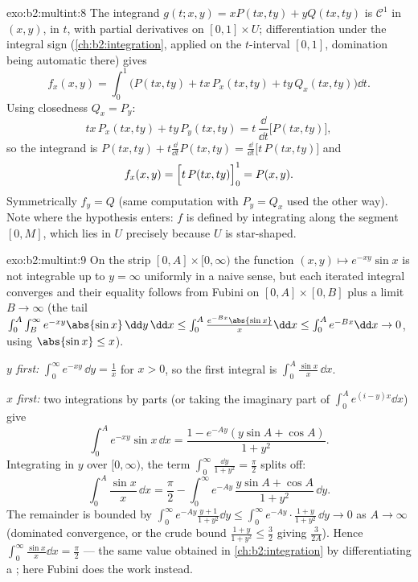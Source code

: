 \begin{solution}{exo:b2:multint:8}
The integrand $g(t; x, y) = xP(tx, ty) + yQ(tx, ty)$ is
$\mathcal{C}^1$ in $(x, y)$,  in $t$, with partial
derivatives  on $[0,1] \times U$; differentiation under
the integral sign (\cref{ch:b2:integration}, applied on the
 $t$-interval $[0,1]$, domination being automatic there)
gives
\[
f_x(x, y)
= \int_0^1 \bigl(P(tx, ty) + tx\,P_x(tx, ty)
+ ty\,Q_x(tx, ty)\bigr)\dd t .
\]
Using closedness $Q_x = P_y$:
\[
tx\,P_x(tx, ty) + ty\,P_y(tx, ty)
= t\,\frac{\dd}{\dd t}\bigl[P(tx, ty)\bigr] ,
\]
so the integrand is $P(tx, ty) + t\frac{\dd}{\dd t}P(tx, ty) =
\frac{\dd}{\dd t}\bigl[t\,P(tx, ty)\bigr]$ and
\[
f_x(x, y) = \Bigl[t\,P(tx, ty)\Bigr]_0^1 = P(x, y) .
\]
Symmetrically $f_y = Q$ (same computation with $P_y = Q_x$ used
the other way). Note where the hypothesis enters: $f$ is defined
by integrating along the segment $[0, M]$, which lies in $U$
precisely because $U$ is star-shaped.
\end{solution}

\begin{solution}{exo:b2:multint:9}
On the strip $[0, A] \times [0, \infty)$ the function $(x, y)
\mapsto e^{-xy}\sin x$ is not  integrable up to $y =
\infty$ uniformly in a naive sense, but each iterated integral
converges and their equality follows from Fubini on $[0, A]
\times [0, B]$ plus a limit $B \to \infty$ (the tail
$\int_0^A\int_B^\infty e^{-xy}\abs{\sin x}\,\dd y\,\dd x \leq
\int_0^A \frac{e^{-Bx}\abs{\sin x}}{x}\dd x \leq \int_0^A e^{-Bx}
\dd x\to 0$, using $\abs{\sin x} \leq x$).

\emph{$y$ first:} $\int_0^\infty e^{-xy}\,\dd y = \frac1x$ for $x
> 0$, so the first integral is $\int_0^A \frac{\sin x}{x}\,\dd x$.

\emph{$x$ first:} two integrations by parts (or taking the
imaginary part of $\int_0^A e^{(i - y)x}\dd x$) give
\[
\int_0^A e^{-xy}\sin x\,\dd x
= \frac{1 - e^{-Ay}(y\sin A + \cos A)}{1 + y^2} .
\]
Integrating in $y$ over $[0, \infty)$, the term $\int_0^\infty
\frac{\dd y}{1 + y^2} = \frac\pi2$ splits off:
\[
\int_0^A \frac{\sin x}{x}\,\dd x
= \frac{\pi}{2}
- \int_0^\infty e^{-Ay}\,\frac{y\sin A + \cos A}{1 + y^2}\,\dd y .
\]
The remainder is bounded by $\int_0^\infty e^{-Ay}\frac{y +
1}{1 + y^2}\dd y \leq \int_0^\infty e^{-Ay}\cdot\frac{1+y}{1+y^2}
\,\dd y \to 0$ as $A \to \infty$ (dominated convergence, or the
crude bound $\frac{1 + y}{1 + y^2} \leq \frac32$ giving
$\frac{3}{2A}$). Hence $\int_0^\infty\frac{\sin x}{x}\dd x =
\frac\pi2$ --- the same value obtained in
\cref{ch:b2:integration} by differentiating a ;
here Fubini does the work instead.
\end{solution}

